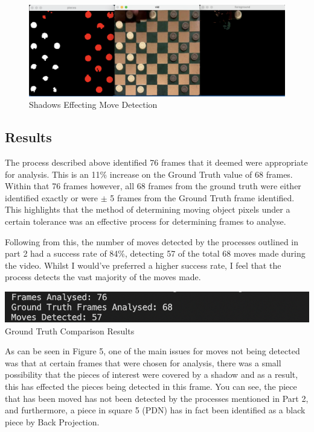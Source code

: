 \documentclass[12pt]{article}
\begin{document}
    \newpage

    \begin{figure}
        \centering
        \includegraphics[scale=0.3]{Shadow-Covering-Pieces.png}
        \caption{Shadows Effecting Move Detection}
    \end{figure}

    \subsection{Results}
    \par
    The process described above identified 76 frames that it deemed were appropriate for analysis. This is an 11\% increase on the Ground Truth value of 68 frames. Within that 76 frames however, all 68 frames from the ground truth were either identified exactly or were 
    \(\pm\) 5 frames from the Ground Truth frame identified. This highlights that the method of determining moving object pixels under a certain tolerance was an effective process for determining frames to analyse.
    \par
    Following from this, the number of moves detected by the processes outlined in part 2 had a success rate of 84\%, detecting 57 of the total 68 moves made during the video. Whilst I would've preferred a higher success rate, I feel that 
    the process detects the vast majority of the moves made.
    \begin{center}
        \includegraphics[scale=1]{AssignPt3Res.png}
        Ground Truth Comparison Results
    \end{center}
    \par
    As can be seen in Figure 5, one of the main issues for moves not being detected was that at certain frames that were chosen for analysis, there was a small possibility that the pieces of interest were covered by a shadow
    and as a result, this has effected the pieces being detected in this frame. You can see, the piece that has been moved has not been detected by the processes mentioned in Part 2, and furthermore, a piece in square 5 (PDN) 
    has in fact been identified as a black piece by Back Projection.
    
\end{document}
